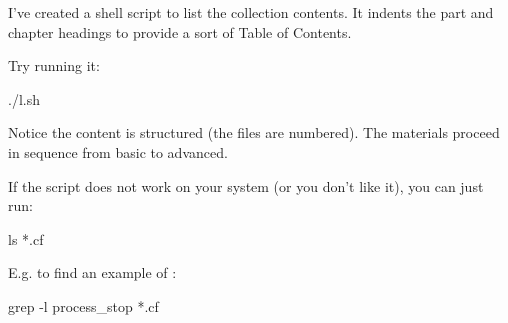 \begin{aside}
\label{aside:exercise_6}

I've created a shell script to list the collection
contents. It indents the part and chapter headings
to provide a sort of Table of Contents.

Try running it:

\begin{code}
./l.sh
\end{code}

Notice the content is structured (the files are numbered).
The materials proceed in sequence from basic to advanced.

If the  script does not work on your system
(or you don't like it), you can just run:

\begin{code}
ls *.cf
\end{code}

\end{aside}





\begin{aside}
\label{aside:exercise_7}

E.g. to find an example of :

\begin{code}
grep -l process_stop *.cf
\end{code}

\end{aside}